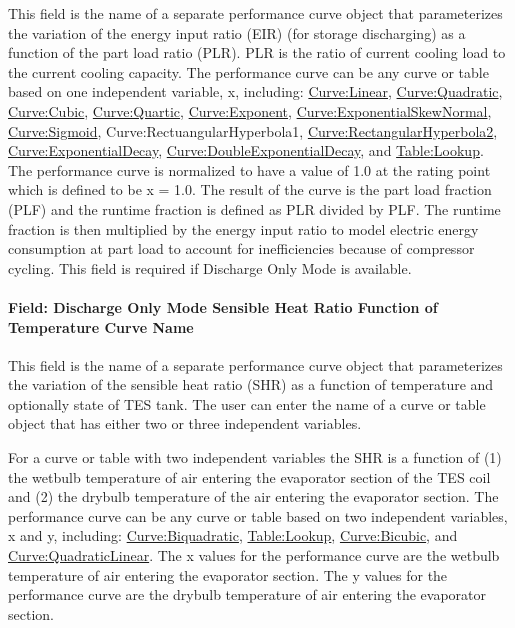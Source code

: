 This field is the name of a separate performance curve object that parameterizes the variation of the energy input ratio (EIR) (for storage discharging) as a function of the part load ratio (PLR). PLR is the ratio of current cooling load to the current cooling capacity. The performance curve can be any curve or table based on one independent variable, x, including: \hyperref[curvelinear]{Curve:Linear}, \hyperref[curvequadratic]{Curve:Quadratic}, \hyperref[curvecubic]{Curve:Cubic}, \hyperref[curvequartic]{Curve:Quartic}, \hyperref[curveexponent]{Curve:Exponent}, \hyperref[curveexponentialskewnormal]{Curve:ExponentialSkewNormal}, \hyperref[curvesigmoid]{Curve:Sigmoid}, Curve:RectuangularHyperbola1, \hyperref[curverectangularhyperbola2]{Curve:RectangularHyperbola2}, \hyperref[curveexponentialdecay]{Curve:ExponentialDecay}, \hyperref[curvedoubleexponentialdecay]{Curve:DoubleExponentialDecay}, and \hyperref[tablelookup]{Table:Lookup}. The performance curve is normalized to have a value of 1.0 at the rating point which is defined to be x = 1.0. The result of the curve is the part load fraction (PLF) and the runtime fraction is defined as PLR divided by PLF. The runtime fraction is then multiplied by the energy input ratio to model electric energy consumption at part load to account for inefficiencies because of compressor cycling. This field is required if Discharge Only Mode is available.

\paragraph{Field: Discharge Only Mode Sensible Heat Ratio Function of Temperature Curve Name}\label{field-discharge-only-mode-sensible-heat-ratio-function-of-temperature-curve-name}

This field is the name of a separate performance curve object that parameterizes the variation of the sensible heat ratio (SHR) as a function of temperature and optionally state of TES tank. The user can enter the name of a curve or table object that has either two or three independent variables.

For a curve or table with two independent variables the SHR is a function of (1) the wetbulb temperature of air entering the evaporator section of the TES coil and (2) the drybulb temperature of the air entering the evaporator section. The performance curve can be any curve or table based on two independent variables, x and y, including: \hyperref[curvebiquadratic]{Curve:Biquadratic}, \hyperref[tablelookup]{Table:Lookup}, \hyperref[curvebicubic]{Curve:Bicubic}, and \hyperref[curvequadraticlinear]{Curve:QuadraticLinear}. The x values for the performance curve are the wetbulb temperature of air entering the evaporator section. The y values for the performance curve are the drybulb temperature of air entering the evaporator section.

